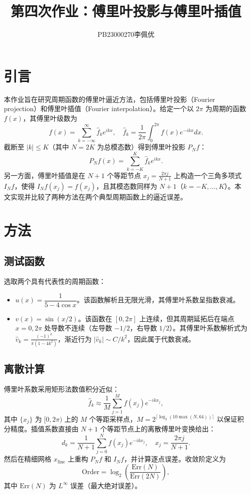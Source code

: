 \documentclass{article}
\title{第四次作业：傅里叶投影与傅里叶插值}
\author{PB23000270李佩优}
\begin{document}
\maketitle

\section{引言}

本作业旨在研究周期函数的傅里叶逼近方法，包括傅里叶投影（Fourier projection）和傅里叶插值（Fourier interpolation）。给定一个以 $2\pi$ 为周期的函数 $f(x)$，其傅里叶级数为
\[
f(x) = \sum_{k=-\infty}^{\infty} \hat{f}_k e^{ikx}, \quad 
\hat{f}_k = \frac{1}{2\pi} \int_0^{2\pi} f(x) e^{-ikx} dx.
\]
截断至 $|k|\le K$（其中 $N=2K$ 为总模态数）得到傅里叶投影 $P_N f$：
\[
P_N f(x) = \sum_{k=-K}^{K} \hat{f}_k e^{ikx}.
\]
另一方面，傅里叶插值是在 $N+1$ 个等距节点 $x_j = \frac{2\pi j}{N+1}$ 上构造一个三角多项式 $I_N f$，使得 $I_N f(x_j)=f(x_j)$，且其模态数同样为 $N+1$（$k=-K,\dots,K$）。本文实现并比较了两种方法在两个典型周期函数上的逼近误差。

\section{方法}

\subsection{测试函数}
选取两个具有代表性的周期函数：
\begin{itemize}
  \item $u(x) = \dfrac{1}{5-4\cos x}$。该函数解析且无限光滑，其傅里叶系数呈指数衰减。
  \item $v(x) = \sin(x/2)$。该函数在 $[0,2\pi]$ 上连续，但其周期延拓后在端点 $x=0,2\pi$ 处导数不连续（左导数 $-1/2$，右导数 $1/2$）。其傅里叶系数解析式为 $\hat{v}_k = \frac{(-1)^k}{\pi(1-4k^2)}$，渐近行为 $|\hat{v}_k| \sim C/k^2$，因此属于代数衰减。
\end{itemize}

\subsection{离散计算}
傅里叶系数采用矩形法数值积分近似：
\[
\hat{f}_k \approx \frac{1}{M} \sum_{j=1}^{M} f(x_j) e^{-ikx_j},
\]
其中 $\{x_j\}$ 为 $[0,2\pi)$ 上的 $M$ 个等距采样点，$M = 2^{\lceil\log_2(10\max(N,64))\rceil}$ 以保证积分精度。插值系数直接由 $N+1$ 个等距节点上的离散傅里叶变换给出：
\[
d_k = \frac{1}{N+1} \sum_{j=0}^{N} f(x_j) e^{-ikx_j},\quad x_j = \frac{2\pi j}{N+1}.
\]
然后在精细网格 $x_{\text{fine}}$ 上重构 $P_N f$ 和 $I_N f$，并计算逐点误差。收敛阶定义为
\[
\text{Order} = \log_2\left(\frac{\text{Err}(N)}{\text{Err}(2N)}\right),
\]
其中 $\text{Err}(N)$ 为 $L^\infty$ 误差（最大绝对误差）。
\end{document}
